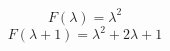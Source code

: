 \documentclass{article}
\begin{document}
\begin{equation} F(\lambda) = \lambda^2 \end{equation}
\begin{equation} F(\lambda+1) = \lambda^2 + 2\lambda + 1 \end{equation}
\end{document}
